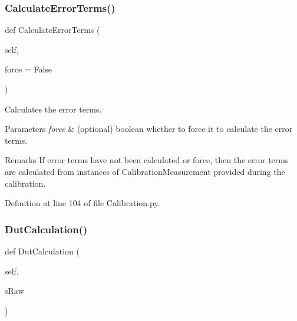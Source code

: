 \subsubsection{\texorpdfstring{Calculate\+Error\+Terms()}{CalculateErrorTerms()}}
{\footnotesize\ttfamily def Calculate\+Error\+Terms (\begin{DoxyParamCaption}\item[{}]{self,  }\item[{}]{force = {\ttfamily False} }\end{DoxyParamCaption})}



Calculates the error terms. 


\begin{DoxyParams}{Parameters}
{\em force} & (optional) boolean whether to force it to calculate the error terms. \\
\hline
\end{DoxyParams}
\begin{DoxyRemark}{Remarks}
If error terms have not been calculated or force, then the error terms are calculated from instances of Calibration\+Measurement provided during the calibration. 
\end{DoxyRemark}


Definition at line 104 of file Calibration.\+py.

\mbox{\label{classSignalIntegrity_1_1Measurement_1_1Calibration_1_1Calibration_1_1Calibration_ac257ff0d436f9c02507349f82ece9e56}} 
\subsubsection{\texorpdfstring{Dut\+Calculation()}{DutCalculation()}}
{\footnotesize\ttfamily def Dut\+Calculation (\begin{DoxyParamCaption}\item[{}]{self,  }\item[{}]{s\+Raw }\end{DoxyParamCaption})}



